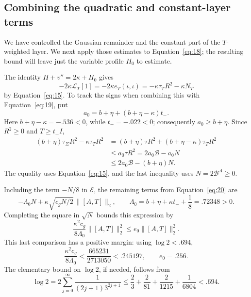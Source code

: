\subsection{Combining the quadratic and constant-layer terms}

We have controlled the Gaussian remainder and the constant part of
the \(T\)-weighted layer.  We next apply those estimates to
Equation~\eqref{eq:18}; the resulting bound will leave just the
variable profile \(H_0\) to estimate.

The identity \(H+v''=2\kappa+H_0\) gives
\[
 -2\kappa\mathcal L_T[1]
 =-2\kappa e_T(\iota,\iota)
 =-\kappa\tau_T R^2-\kappa N_T
\]
by Equation~\eqref{eq:15}.
To track the signs when combining this with
Equation~\eqref{eq:19}, put
\[
 a_0=b+\eta+(b+\eta-\kappa)t_-.
\]
Here \(b+\eta-\kappa=-.536<0\), while \(t_-=-.022<0\);
consequently \(a_0\ge b+\eta\).
Since \(R^2\ge0\) and \(T\ge t_-I\),
\[
 \begin{aligned}
 (b+\eta)\tau_\Sigma R^2-\kappa\tau_T R^2
 &=(b+\eta)\tau R^2+(b+\eta-\kappa)\tau_T R^2\\
 &\le a_0\tau R^2
   =2a_0\mathcal B-a_0N\\
 &\le 2a_0\mathcal B-(b+\eta)N.
 \end{aligned}
\]
The equality uses Equation~\eqref{eq:15}, and the last inequality
uses \(N=2\mathcal B^A\ge0\).

Including the term \(-N/8\) in \(\mathcal E\), the remaining
terms from Equation~\eqref{eq:20} are
\[
 -\Lambda_0N+\kappa\sqrt{c_gN/2}\,\|[A,T]\|_2,\qquad
 \Lambda_0=b+\eta+\kappa t_-+\frac18=.72348>0.
\]
Completing the square in \(\sqrt N\) bounds this expression by
\[
 \frac{\kappa^2c_g}{8\Lambda_0}\|[A,T]\|_2^2
 \le e_0\|[A,T]\|_2^2.
\]
This last comparison has a positive margin: using \(\log2<.694\),
\[
 \frac{\kappa^2c_g}{8\Lambda_0}
 <\frac{665231}{2713050}<.245197,
 \qquad e_0=.256.
\]
The elementary bound on \(\log2\), if needed, follows from
\[
 \log2=2\sum_{j=0}^\infty
              \frac1{(2j+1)3^{2j+1}}
 \le \frac23+\frac2{81}+\frac2{1215}+\frac1{6804}<.694.
\]

